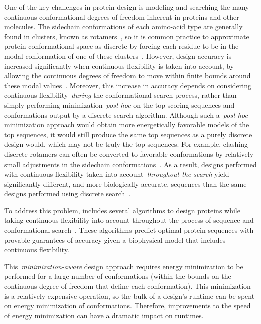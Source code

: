 One of the key challenges in protein design is modeling and searching the many continuous conformational degrees of freedom inherent in proteins and other molecules. The sidechain conformations of each amino-acid type are generally found in clusters, known as rotamers~\cite{rotamers}, so it is common practice to approximate protein conformational space as discrete by forcing each residue to be in the modal conformation of one of these clusters~\cite{DEE,DEE/A*}.  However, design accuracy is increased significantly when continuous flexibility is taken into account, by allowing the continuous degrees of freedom to move within finite bounds around these modal values~\cite{iMinDEE,DEEPer,OSPREY_MIE,BBK*}.  Moreover, this increase in accuracy depends on considering continuous flexibility~\textit{during} the conformational search process, rather than simply performing minimization~\textit{post hoc} on the top-scoring sequences and conformations output by a discrete search algorithm.  Although such a~\textit{post hoc} minimization approach would obtain more energetically favorable models of the top sequences, it would still produce the same top sequences as a purely discrete design would, which may not be truly the top sequences.  For example, clashing discrete rotamers can often be converted to favorable conformations by relatively small adjustments in the sidechain conformations~\cite{minDEE,iMinDEE,DEEPer,CATS}.  As a result, designs performed with continuous flexibility taken into account~\textit{throughout the search} yield significantly different, and more biologically accurate, sequences than the same designs performed using discrete search~\cite{iMinDEE,DEEPer,OSPREY_MIE}.  

To address this problem, \osprey includes several algorithms to design proteins while taking continuous flexibility into account throughout the process of sequence and conformational search~\cite{minDEE,iMinDEE,DEEPer,EPIC,LUTE_RECOMB,CATS}.   These algorithms predict optimal protein sequences with provable guarantees of accuracy given a biophysical model that includes continuous flexibility.  

This~\textit{minimization-aware} design approach requires energy minimization to be performed for a large number of conformations (within the bounds on the continuous degree of freedom that define each conformation).  This minimization is a relatively expensive operation, so the bulk of a design's runtime can be spent on energy minimization of conformations. Therefore, improvements to the speed of energy minimization can have a dramatic impact on \osprey runtimes.  

